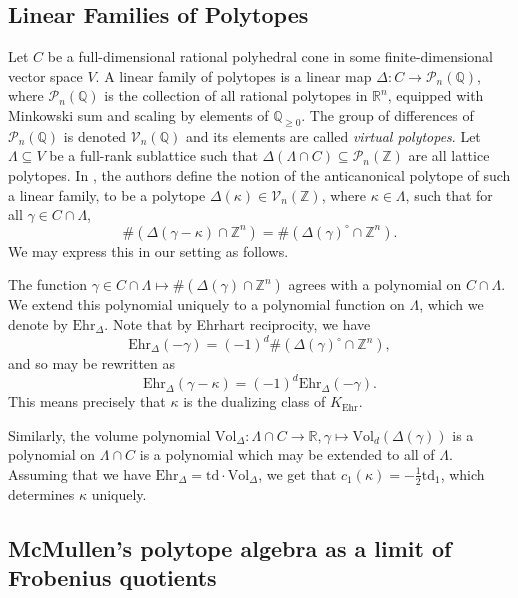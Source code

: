\documentclass[oneside]{amsart}
\theoremstyle{plain}
\theoremstyle{definition}
\newcommand{\R}{{\mathbb{R}}}
\newcommand{\Z}{{\mathbb{Z}}}
\newcommand{\Q}{{\mathbb{Q}}}
\newcommand{\cP}{{\mathcal{P}}}
\newcommand{\cV}{{\mathcal{V}}}
\newcommand{\Vol}{{\mathrm{Vol}}}
\newcommand{\Ehr}{{\mathrm{Ehr}}}
\newcommand{\td}{{\mathrm{td}}}
\begin{document}
\subsection{Linear Families of Polytopes}
\label{subsec:linear-families}

Let $C$ be a full-dimensional rational polyhedral cone in some finite-dimensional vector space $V$.
A linear family of polytopes is a linear map $\Delta: C \to \cP_n(\Q)$, where $\cP_n(\Q)$ is the collection of all rational polytopes in $\R^n$, equipped with Minkowski sum and scaling by elements of $\Q_{\geq 0}$. The group of differences of $\cP_n(\Q)$ is denoted $\cV_n(\Q)$ and its elements are called \emph{virtual polytopes}.
Let $\Lambda \subseteq V$ be a full-rank sublattice such that $\Delta(\Lambda \cap C) \subseteq \cP_n(\Z)$ are all lattice polytopes.
In \cite{kavvil}, the authors define the notion of the anticanonical polytope of such a linear family, to be a polytope $\Delta(\kappa) \in \cV_n(\Z)$, where $\kappa \in \Lambda$, such that for all $\gamma \in C \cap \Lambda$,
\begin{equation}\label{eq:serre-duality-lattice-counts}
    \#(\Delta(\gamma - \kappa) \cap \Z^n) = \#(\Delta(\gamma)^\circ \cap \Z^n).
\end{equation}
We may express this in our setting as follows.

The function $\gamma \in C \cap \Lambda \mapsto \#(\Delta(\gamma) \cap \Z^n)$ agrees with a polynomial on $C \cap \Lambda$. We extend this polynomial uniquely to a polynomial function on $\Lambda$, which we denote by $\Ehr_\Delta$.
Note that by Ehrhart reciprocity, we have
\[
    \Ehr_\Delta(-\gamma) = (-1)^d \#(\Delta(\gamma)^\circ \cap \Z^n),
\]
and so  may be rewritten as
\[
    \Ehr_\Delta(\gamma - \kappa) = (-1)^d\Ehr_\Delta(-\gamma).
\]
This means precisely that $\kappa$ is the dualizing class of $K_\Ehr$.

Similarly, the volume polynomial $\Vol_\Delta: \Lambda \cap C \to \R, \gamma \mapsto \Vol_d(\Delta(\gamma))$ is a polynomial on $\Lambda \cap C$ is a polynomial which may be extended to all of $\Lambda$.
Assuming that we have $\Ehr_\Delta = \td \cdot \Vol_\Delta$, we get that $c_1(\kappa) = -\frac{1}{2} \td_1$,
which determines $\kappa$ uniquely.

\subsection{McMullen's polytope algebra as a limit of Frobenius quotients}
\label{subsec:polytope-algebra-lambda-structure}
\end{document}
